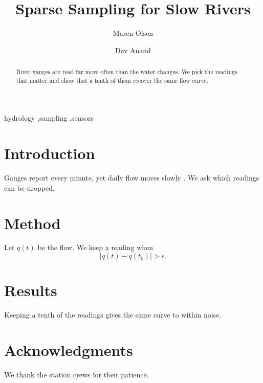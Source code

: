 \documentclass[preprint,12pt]{elsarticle}
\begin{document}
\begin{frontmatter}

\title{Sparse Sampling for Slow Rivers}

\author[a]{Maren Olsen}
\author[b]{Dev Anand}


\begin{abstract}
River gauges are read far more often than the water changes. We pick the
readings that matter and show that a tenth of them recover the same
flow curve.
\end{abstract}

\begin{keyword}
hydrology \sep sampling \sep sensors
\end{keyword}

\end{frontmatter}

\section{Introduction}
Gauges report every minute, yet daily flow moves slowly \cite{lindqvist19}.
We ask which readings can be dropped.

\section{Method}
Let $q(t)$ be the flow. We keep a reading when
\begin{equation}
  |q(t)-q(t_0)| > \epsilon .
\end{equation}

\section{Results}
Keeping a tenth of the readings gives the same curve to within noise.

\section*{Acknowledgments}
We thank the station crews for their patience.



\end{document}
